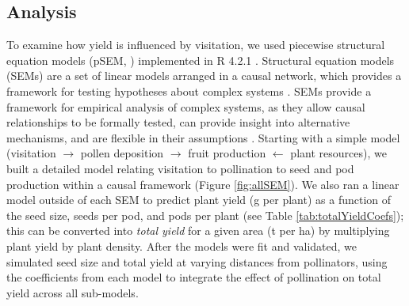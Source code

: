 \documentclass[12pt]{article} %
\begin{document}
\subsection*{Analysis}
To examine how yield is influenced by visitation, we used piecewise structural equation models (pSEM, \citealp{shipley2009}) implemented in R 4.2.1 \citep{Rcore}.
Structural equation models (SEMs) are a set of linear models arranged in a causal network, which provides a framework for testing hypotheses about complex systems \citep{grace2012, lefcheck2015}.
SEMs provide a framework for empirical analysis of complex systems, as they allow causal relationships to be formally tested, can provide insight into alternative mechanisms, and are flexible in their assumptions \citep{shipley2009,clough2012, grace2012}.
Starting with a simple model (visitation $\rightarrow$ pollen deposition $\rightarrow$ fruit production $\leftarrow$ plant resources), we built a detailed model relating visitation to pollination to seed and pod production within a causal framework (Figure \ref{fig:allSEM}).
We also ran a linear model outside of each SEM to predict plant yield (g per plant) as a function of the seed size, seeds per pod, and pods per plant (see Table \ref{tab:totalYieldCoefs}); this can be converted into \emph{total yield} for a given area (t per ha) by multiplying plant yield by plant density. 
After the models were fit and validated, we simulated seed size and total yield at varying distances from pollinators, using the coefficients from each model to integrate the effect of pollination on total yield across all sub-models.
\end{document}
